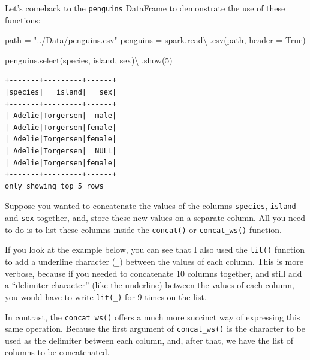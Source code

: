 \documentclass[
  11pt,
  letterpaper,
  DIV=11,
  numbers=noendperiod]{scrreprt}
\newenvironment{Shaded}{\begin{snugshade}}{\end{snugshade}}
\newcommand{\DecValTok}[1]{\textcolor[rgb]{0.68,0.00,0.00}{#1}}
\newcommand{\NormalTok}[1]{\textcolor[rgb]{0.00,0.23,0.31}{#1}}
\newcommand{\OperatorTok}[1]{\textcolor[rgb]{0.37,0.37,0.37}{#1}}
\newcommand{\StringTok}[1]{\textcolor[rgb]{0.13,0.47,0.30}{#1}}
\newcommand{\VariableTok}[1]{\textcolor[rgb]{0.07,0.07,0.07}{#1}}
\begin{document}
Let's comeback to the \texttt{penguins} DataFrame to demonstrate the use
of these functions:

\begin{Shaded}
\begin{Highlighting}[]
\NormalTok{path }\OperatorTok{=} \StringTok{"../Data/penguins.csv"}
\NormalTok{penguins }\OperatorTok{=}\NormalTok{ spark.read}\OperatorTok{\textbackslash{}}
\NormalTok{    .csv(path, header }\OperatorTok{=} \VariableTok{True}\NormalTok{)}

\NormalTok{penguins.select(}\StringTok{\textquotesingle{}species\textquotesingle{}}\NormalTok{, }\StringTok{\textquotesingle{}island\textquotesingle{}}\NormalTok{, }\StringTok{\textquotesingle{}sex\textquotesingle{}}\NormalTok{)}\OperatorTok{\textbackslash{}}
\NormalTok{    .show(}\DecValTok{5}\NormalTok{)}
\end{Highlighting}
\end{Shaded}

\begin{verbatim}
+-------+---------+------+
|species|   island|   sex|
+-------+---------+------+
| Adelie|Torgersen|  male|
| Adelie|Torgersen|female|
| Adelie|Torgersen|female|
| Adelie|Torgersen|  NULL|
| Adelie|Torgersen|female|
+-------+---------+------+
only showing top 5 rows
\end{verbatim}

Suppose you wanted to concatenate the values of the columns
\texttt{species}, \texttt{island} and \texttt{sex} together, and, store
these new values on a separate column. All you need to do is to list
these columns inside the \texttt{concat()} or \texttt{concat\_ws()}
function.

If you look at the example below, you can see that I also used the
\texttt{lit()} function to add a underline character (\texttt{\_})
between the values of each column. This is more verbose, because if you
needed to concatenate 10 columns together, and still add a ``delimiter
character'' (like the underline) between the values of each column, you
would have to write \texttt{lit(\textquotesingle{}\_\textquotesingle{})}
for 9 times on the list.

In contrast, the \texttt{concat\_ws()} offers a much more succinct way
of expressing this same operation. Because the first argument of
\texttt{concat\_ws()} is the character to be used as the delimiter
between each column, and, after that, we have the list of columns to be
concatenated.
\end{document}
